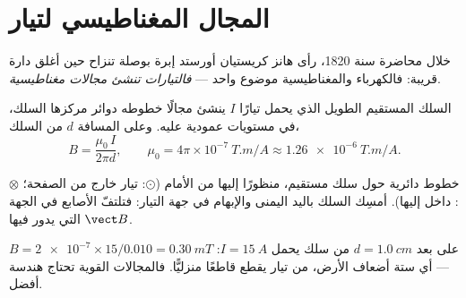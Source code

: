 \section{المجال المغناطيسي لتيار}

\begin{remark}[أورستد، 1820]\label{rem:g11:magnetic-fields:oersted}
خلال محاضرة سنة 1820، رأى هانز كريستيان أورستد إبرة بوصلة
تنزاح حين أغلق دارة قريبة: فالكهرباء والمغناطيسية
موضوع واحد --- \emph{فالتيارات تنشئ مجالات مغناطيسية}.
\end{remark}

\begin{proposition}\label{prop:g11:magnetic-fields:wire}
السلك المستقيم الطويل الذي يحمل تيارًا $I$ ينشئ مجالًا
خطوطه دوائر مركزها السلك، في مستويات عمودية عليه.
وعلى المسافة $d$ من السلك،
\[
B = \frac{\mu_0\, I}{2\pi d},
\qquad \mu_0 = 4\pi\times 10^{-7}\ \unit{T.m/A} \approx \qty{1.26e-6}{T.m/A}.
\]
\end{proposition}
\admitted

\begin{omfigure}
\qquad\qquad
{}

{\small خطوط  دائرية حول سلك مستقيم، منظورًا إليها من الأمام
($\odot$: تيار خارج من الصفحة؛ $\otimes$: داخل إليها). أمسِك السلك
باليد اليمنى والإبهام في جهة التيار: فتلتفّ الأصابع في الجهة
التي يدور فيها $\vect B$.}
\end{omfigure}

\begin{example}\label{ex:g11:magnetic-fields:wire}
على بعد $d = \qty{1.0}{cm}$ من سلك يحمل $I = \qty{15}{A}$:
$B = \num{2e-7} \times 15 / 0.010 = \qty{0.30}{mT}$ --- أي ستة أضعاف 
الأرض، من تيار يقطع قاطعًا منزليًّا. فالمجالات القوية
تحتاج هندسة أفضل.
\end{example}

